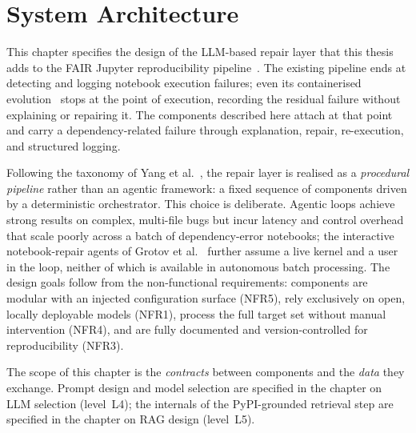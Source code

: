 %
%
%  

\chapter{System Architecture}
\label{chap:architecture}

This chapter specifies the design of the LLM-based repair layer that
this thesis adds to the FAIR Jupyter reproducibility
pipeline~\cite{samuel2024gigascience}. %
The existing pipeline ends at detecting and logging notebook execution
failures; even its containerised
evolution~\cite{samuel2025docker} %
stops at the point of execution, recording the residual failure without
explaining or repairing it. The components described here attach at that
point and carry a dependency-related failure through explanation, repair,
re-execution, and structured logging.

Following the taxonomy of Yang et al.~\cite{yang2025survey}, %
the repair layer is realised as a \emph{procedural pipeline} rather than
an agentic framework: a fixed sequence of components driven by a
deterministic orchestrator. This choice is deliberate. Agentic loops
achieve strong results on complex, multi-file bugs but incur latency and
control overhead that scale poorly across a batch of dependency-error
notebooks; the interactive notebook-repair agents of Grotov et
al.~\cite{grotov2024untangling,grotov2024debug} %
further assume a live kernel and a user in the loop, neither of which is
available in autonomous batch processing. The design goals follow from
the non-functional requirements: components are modular with an injected
configuration surface (NFR5), rely exclusively on open, locally
deployable models (NFR1), process the full target set without manual
intervention (NFR4), and are fully documented and version-controlled for
reproducibility (NFR3).

The scope of this chapter is the \emph{contracts} between components and
the \emph{data} they exchange. Prompt design and model selection are
specified in the chapter on LLM selection (level~L4); the internals of
the PyPI-grounded retrieval step are specified in the chapter on RAG
design (level~L5). %

